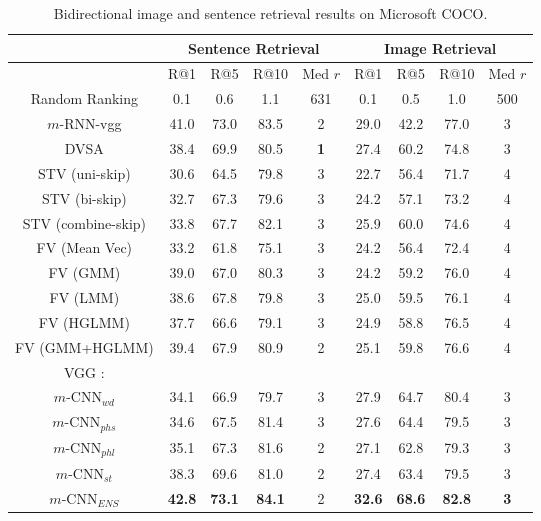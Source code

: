 \documentclass[10pt,twocolumn,letterpaper]{article}
\begin{document}
\begin{table*} \small
\begin{center}
\begin{tabular}{c|cccc|cccc}
    \hline
          & \multicolumn{4}{|c|}{Sentence Retrieval} & \multicolumn{4}{|c}{Image Retrieval}  \\
          \hline
          \hline
        & R@1 & R@5 & R@10 & Med $r$ & R@1 & R@5 & R@10 & Med $r$ \\
        \hline
        \hline
        Random Ranking & 0.1 & 0.6 & 1.1 & 631 & 0.1 & 0.5  & 1.0 & 500\\
        $m$-RNN-vgg \cite{mao_iclr_2015}& 41.0 & 73.0 & 83.5 & 2 & 29.0 & 42.2  & 77.0 & 3\\
        DVSA\cite{karpathy_dvsa_2014}& 38.4 & 69.9 & 80.5 & \textbf{1} & 27.4 & 60.2  & 74.8 & 3\\


        STV (uni-skip) \cite{kiros_2015} & 30.6 & 64.5 & 79.8 & 3 & 22.7 & 56.4 & 71.7 & 4 \\
        STV (bi-skip) \cite{kiros_2015} & 32.7 & 67.3 & 79.6 & 3 & 24.2 & 57.1 & 73.2 & 4 \\
        STV (combine-skip) \cite{kiros_2015} & 33.8 & 67.7 & 82.1 & 3 & 25.9 & 60.0 & 74.6 & 4 \\

        FV (Mean Vec) \cite{klein_cvpr2015} & 33.2 & 61.8 & 75.1 & 3 & 24.2 & 56.4 & 72.4 & 4 \\
        FV (GMM) \cite{klein_cvpr2015} & 39.0 & 67.0 & 80.3 & 3& 24.2 & 59.2 & 76.0 & 4 \\
        FV (LMM) \cite{klein_cvpr2015} & 38.6 & 67.8 & 79.8 & 3 & 25.0 & 59.5 & 76.1 & 4 \\
        FV (HGLMM) \cite{klein_cvpr2015} & 37.7 & 66.6 & 79.1 & 3 & 24.9 & 58.8 & 76.5 & 4 \\
        FV (GMM+HGLMM) \cite{klein_cvpr2015} & 39.4 & 67.9 & 80.9 & 2 & 25.1 & 59.8 & 76.6 & 4 \\

        \hline
        \hline
        VGG \cite{simonyan_arxiv2014}:&&&&&&&& \\
        $m$-CNN$_{wd}$ & 34.1 & 66.9 & 79.7 & 3 & 27.9 & 64.7 & 80.4 & 3\\
        $m$-CNN$_{phs}$& 34.6 & 67.5 & 81.4 & 3 & 27.6 & 64.4 & 79.5 & 3\\
        $m$-CNN$_{phl}$& 35.1 & 67.3 & 81.6 & 2 & 27.1 & 62.8 & 79.3 & 3\\
        $m$-CNN$_{st}$ & 38.3 & 69.6 & 81.0 & 2 & 27.4 & 63.4 & 79.5 & 3\\
        $m$-CNN$_{ENS}$ & \textbf{42.8} & \textbf{73.1} & \textbf{84.1} & {2} & \textbf{32.6} & \textbf{68.6} & \textbf{82.8} & \textbf{3}\\
        \hline
        \hline

    \end{tabular}


\end{center}
\caption{Bidirectional image and sentence retrieval results on Microsoft COCO.}\label{table:mscoco}
\end{table*}
\end{document}
